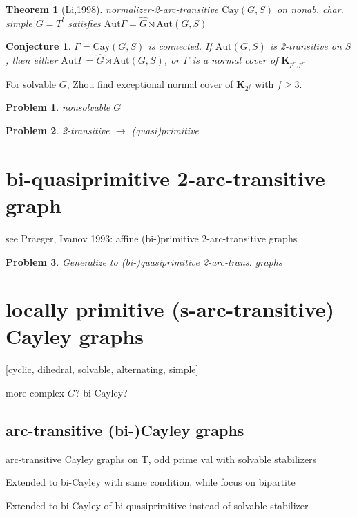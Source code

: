 \documentclass[a4paper,11pt,openany]{book}
\newtheorem{theorem}{Theorem}[section]
\newtheorem{conjecture}{Conjecture}[section]
\newtheorem{problem}{Problem}[section]
\def\Aut{\mathrm{Aut}}
\def\Cay{\mathrm{Cay}}
\begin{document}
\begin{theorem}[Li,1998]
	normalizer-2-arc-transitive  $\Cay(G,S)$ on nonab. char. simple $G=T^l$ satisfies $\Aut\Gamma=\hat{G}\rtimes \Aut(G,S)$
\end{theorem}

\begin{conjecture}
	$\Gamma=\Cay(G,S)$ is connected. If $\Aut(G,S)$ is 2-transitive on $S$, then either $\Aut\Gamma=\hat{G}\rtimes \Aut(G,S)$, or $\Gamma$ is a normal cover of $\mathbf{K}_{p^e,p^e}$
\end{conjecture}

For solvable $G$, Zhou find exceptional normal cover of $\mathbf{K}_{2^f}$ with $f\geq 3$.

\begin{problem}
	nonsolvable $G$
\end{problem}

\begin{problem}
	2-transitive $\rightarrow$ (quasi)primitive
\end{problem}



\section{bi-quasiprimitive 2-arc-transitive graph}
see Praeger, Ivanov 1993: affine (bi-)primitive 2-arc-transitive graphs
\begin{problem}
	Generalize to (bi-)quasiprimitive 2-arc-trans. graphs
\end{problem}


\section{locally primitive (s-arc-transitive) Cayley graphs}
[cyclic, dihedral, solvable, alternating, simple] 

more complex $G$? bi-Cayley?

\subsection{arc-transitive (bi-)Cayley graphs}
arc-transitive Cayley graphs on T, odd prime val with solvable stabilizers

Extended to bi-Cayley with same condition, while focus on bipartite

Extended to bi-Cayley of bi-quasiprimitive instead of solvable stabilizer
\end{document}
